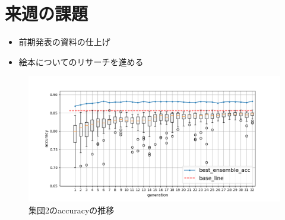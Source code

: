 \documentclass[twocolumn]{jarticle}     %
\begin{document}
\section{来週の課題}
\begin{itemize}
	\item 前期発表の資料の仕上げ
	\item 絵本についてのリサーチを進める
\end{itemize}

\begin{figure}[b]
	\centering
	\includegraphics[scale=0.8]{graph.png}
	\caption{集団2のaccuracyの推移\label{fig:graph}}
\end{figure}
\end{document}
